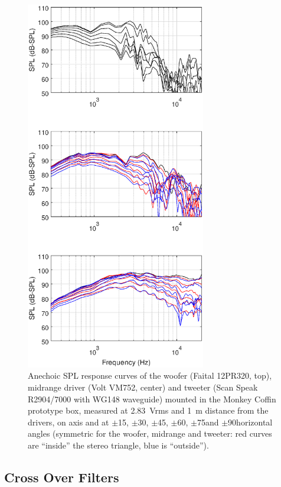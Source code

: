\documentclass[12pt,a4paper]{article}
\providecommand{\figlabel}[1]{\label{fig:#1}}
\begin{document}
\begin{figure}[p]
	\centering
	\vspace{-10ex}
	\includegraphics[width=0.7\textwidth]{SPL_curves_raw.eps}
	\caption{Anechoic SPL response curves of the woofer (Faital 12PR320, top), midrange driver (Volt VM752, center) and tweeter (Scan Speak R2904/7000 with WG148 wave\-guide) mounted in the Monkey Coffin prototype box, measured at \SI{2.83}{Vrms} and \SI{1}{m} distance from the drivers, on axis and at $\pm$15\degree, $\pm$30\degree, $\pm$45\degree, $\pm$60\degree, $\pm$75\degree and $\pm$90\degree horizontal angles (symmetric for the woofer, midrange and tweeter: red curves are ``inside'' the stereo triangle, blue is ``outside'').}
	\figlabel{SPL_curves_raw}
\end{figure}

\subsection{Cross Over Filters}
\end{document}

